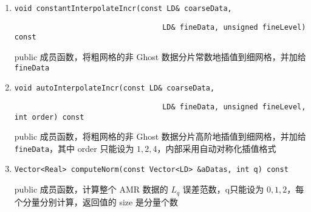 \documentclass[cn, bibend=bibtex]{elegantpaper}
\theoremstyle{plain}
\begin{document}
\begin{itemize}
\begin{enumerate}
    \item \lstinline|void constantInterpolateIncr(const LD& coarseData, |
    
          \lstinline|                                  LD& fineData, unsigned fineLevel) const|

    public 成员函数，将粗网格的非 Ghost 数据分片常数地插值到细网格，并加给 \lstinline|fineData|
        \item \lstinline|void autoInterpolateIncr(const LD& coarseData, |
    
          \lstinline|                                  LD& fineData, unsigned fineLevel, int order) const|

    public 成员函数，将粗网格的非 Ghost 数据分片高阶地插值到细网格，并加给 \lstinline|fineData|，其中 order 只能设为 $1,2,4$，内部采用自动对称化插值格式
    \item \lstinline|Vector<Real> computeNorm(const Vector<LD> &aDatas, int q) const|

    public 成员函数，计算整个 AMR 数据的 $L_q$ 误差范数，q只能设为 $0,1,2$，每个分量分别计算，返回值的 size 是分量个数
  \end{enumerate}
\end{itemize}





\end{document}
